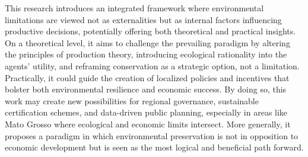 This research introduces an integrated framework where environmental limitations are viewed not as externalities but as internal factors influencing productive decisions, potentially offering both theoretical and practical insights. On a theoretical level, it aims to challenge the prevailing paradigm by altering the principles of production theory, introducing ecological rationality into the agents' utility, and reframing conservation as a strategic option, not a limitation. Practically, it could guide the creation of localized policies and incentives that bolster both environmental resilience and economic success. By doing so, this work may create new possibilities for regional governance, sustainable certification schemes, and data-driven public planning, especially in areas like Mato Grosso where ecological and economic limits intersect. More generally, it proposes a paradigm in which environmental preservation is not in opposition to economic development but is seen as the most logical and beneficial path forward.


\newpage

